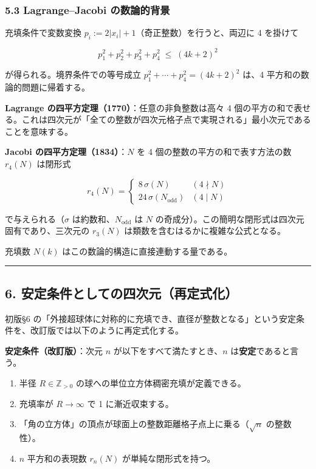 \documentclass[a4paper,11pt]{ltjsarticle}
\theoremstyle{definition}
\providecommand{\tightlist}{\setlength{\itemsep}{0pt}\setlength{\parskip}{0pt}}
\begin{document}
\subsubsection{5.3 Lagrange--Jacobi
の数論的背景}\label{lagrangejacobi-ux306eux6570ux8ad6ux7684ux80ccux666f}

充填条件で変数変換 \(p_i := 2|x_i| + 1\)（奇正整数）を行うと、両辺に 4
を掛けて

\[p_1^2 + p_2^2 + p_3^2 + p_4^2 \;\le\; (4k+2)^2\]

が得られる。境界条件での等号成立 \(p_1^2 + \cdots + p_4^2 = (4k+2)^2\)
は、4 平方和の数論的問題に帰着する。

\textbf{Lagrange の四平方定理（1770）}：任意の非負整数は高々 4
個の平方の和で表せる。これは四次元が「全ての整数が四次元格子点で実現される」最小次元であることを意味する。

\textbf{Jacobi の四平方定理（1834）}：\(N\) を 4
個の整数の平方の和で表す方法の数 \(r_4(N)\) は閉形式

\[r_4(N) = \begin{cases} 8\,\sigma(N) & (4 \nmid N) \\ 24\,\sigma(N_{\text{odd}}) & (4 \mid N) \end{cases}\]

で与えられる（\(\sigma\) は約数和、\(N_{\text{odd}}\) は \(N\)
の奇成分）。この簡明な閉形式は四次元固有であり、三次元の \(r_3(N)\)
は類数を含むはるかに複雑な公式となる。

充填数 \(N(k)\) はこの数論的構造に直接連動する量である。

\begin{center}\rule{0.5\linewidth}{0.5pt}\end{center}

\subsection{6.
安定条件としての四次元（再定式化）}\label{ux5b89ux5b9aux6761ux4ef6ux3068ux3057ux3066ux306eux56dbux6b21ux5143ux518dux5b9aux5f0fux5316}

初版§6
の「外接超球体に対称的に充填でき、直径が整数となる」という安定条件を、改訂版では以下のように再定式化する。

\textbf{安定条件（改訂版）}：次元 \(n\) が以下をすべて満たすとき、\(n\)
は\textbf{安定}であると言う。

\begin{enumerate}
\def\labelenumi{\arabic{enumi}.}
\tightlist
\item
  半径 \(R \in \mathbb{Z}_{>0}\)
  の球への単位立方体稠密充填が定義できる。
\item
  充填率が \(R \to \infty\) で 1 に漸近収束する。
\item
  「角の立方体」の頂点が球面上の整数距離格子点上に乗る（\(\sqrt{n}\)
  の整数性）。
\item
  \(n\) 平方和の表現数 \(r_n(N)\) が単純な閉形式を持つ。
\end{enumerate}
\end{document}
